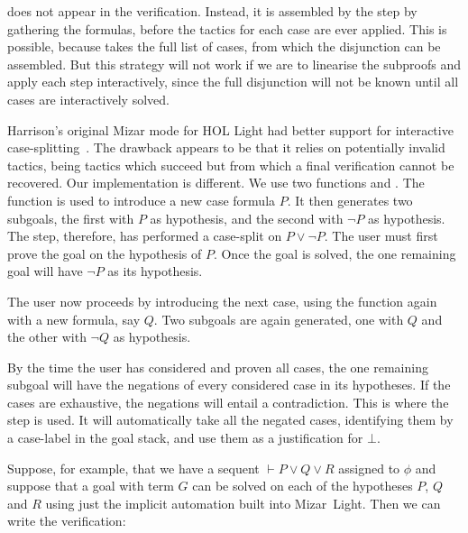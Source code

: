 \noindent does not appear in the verification. Instead, it is assembled by the  step by gathering the  formulas, before the tactics for each case are ever applied. This is possible, because  takes the full list of cases, from which the disjunction can be assembled. But this strategy will not work if we are to linearise the subproofs and apply each step interactively, since the full disjunction will not be known until all cases are interactively solved.

Harrison's original Mizar mode for HOL Light had better support for interactive case-splitting~\cite{MizarHOL}. The drawback appears to be that it relies on potentially invalid tactics, being tactics which succeed but from which a final verification cannot be recovered. Our implementation is different. We use two functions  and . The  function is used to introduce a new case formula $P$. It then generates two subgoals, the first with $P$ as hypothesis, and the second with $\neg P$ as hypothesis. The  step, therefore, has performed a case-split on $P\vee\neg P$. The user must first prove the goal on the hypothesis of $P$. Once the goal is solved, the one remaining goal will have $\neg P$ as its hypothesis.

The user now proceeds by introducing the next case, using the  function again with a new formula, say $Q$. Two subgoals are again generated, one with $Q$ and the other with $\neg Q$ as hypothesis.

By the time the user has considered and proven all cases, the one remaining subgoal will have the negations of every considered case in its hypotheses. If the cases are exhaustive, the negations will entail a contradiction. This is where the  step is used. It will automatically take all the negated cases, identifying them by a case-label  in the goal stack, and use them as a justification for $\bot$.

Suppose, for example, that we have a sequent $\vdash P \vee Q \vee R$ assigned to $\phi$ and suppose that a goal with term $G$ can be solved on each of the hypotheses $P$, $Q$ and $R$ using just the implicit automation built into Mizar~Light. Then we can write the verification:

\vspace{0.5cm}
\begin{minipage}{\linewidth}
  \footnotesize






\end{minipage}
\vspace{0.5cm}

